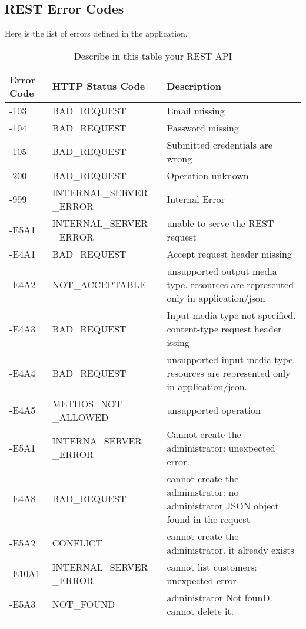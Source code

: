 \subsection{REST Error Codes}

Here is the list of errors defined in the application.


\begin{longtable}{|p{}|p{} |p{}|} 
\hline
\textbf{Error Code} & \textbf{HTTP Status Code} & \textbf{Description} \\\hline

-103 & BAD\_REQUEST &  Email missing \\\hline
-104 & BAD\_REQUEST &  Password missing \\\hline
-105 & BAD\_REQUEST &  Submitted credentials are wrong \\\hline
-200 & BAD\_REQUEST &  Operation unknown \\\hline
-999 & INTERNAL\_SERVER
\_ERROR &  Internal Error \\\hline
-E5A1 & INTERNAL\_SERVER
\_ERROR &  unable to serve the REST request \\\hline
-E4A1 & BAD\_REQUEST &  Accept request header missing\\\hline

-E4A2 & NOT\_ACCEPTABLE &  unsupported output media type. resources are represented only in application/json\\\hline
-E4A3 & BAD\_REQUEST &  Input media type not specified. content-type request header issing\\\hline
-E4A4 & BAD\_REQUEST &  unsupported input media type. resources are represented only in application/json.\\\hline
-E4A5 & METHOS\_NOT
\_ALLOWED  &  unsupported operation\\\hline
-E5A1 & INTERNA\_SERVER
\_ERROR   & Cannot create the administrator: unexpected error.\\\hline
-E4A8 & BAD\_REQUEST &  cannot create the administrator: no administrator JSON object found in the request\\\hline
-E5A2 & CONFLICT  &  cannot create the administrator. it already exists\\\hline
-E10A1 & INTERNAL\_SERVER
\_ERROR &  cannot list customers: unexpected error
\\\hline
-E5A3 & NOT\_FOUND  &  administrator Not founD. cannot delete it.\\\hline
\caption{Describe in this table your REST API}
\label{tab:termGlossary}
\end{longtable}